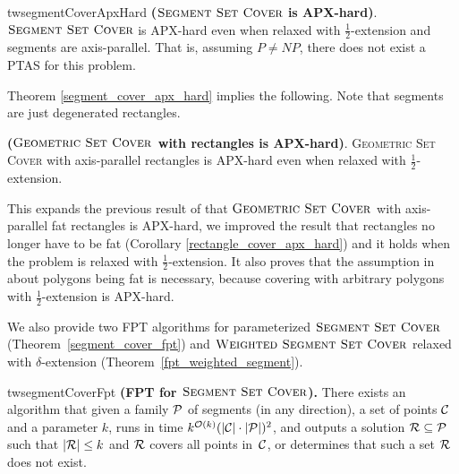 \begin{restatable}{tw}{segmentCoverApxHard}{
\label{segment_cover_apx_hard}
	\textbf{($\textsc{Segment Set Cover}$ is APX-hard)}.	
	$\textsc{Segment Set Cover}$
	is APX-hard even when 
	relaxed with $\frac{1}{2}$-extension
	and segments are axis-parallel.
	That is, assuming $P\neq NP$, there does not exist a PTAS
	for this problem.
}\end{restatable}

Theorem \ref{segment_cover_apx_hard} implies the following.
Note that segments are just degenerated rectangles.

\begin{corollary}{
\label{rectangle_cover_apx_hard}
	\textbf{($\textsc{Geometric Set Cover}$ with rectangles is APX-hard)}.	
	\textsc{Geometric} \textsc{Set} \textsc{Cover}
	with axis-parallel rectangles is APX-hard
	even when relaxed with $\frac{1}{2}$-extension.
}\end{corollary}

This expands the previous result of \cite{rectangles_apx_hard} 
that $\textsc{Geometric Set Cover}$
with axis-parallel fat rectangles is APX-hard,
we improved the result that rectangles no longer
have to be fat (Corollary \ref{rectangle_cover_apx_hard})
and it holds when the problem is relaxed with $\frac{1}{2}$-extension.
It also proves that the assumption in \cite{harpeled12}
about polygons being fat is necessary, because
covering with arbitrary polygons with $\frac{1}{2}$-extension is APX-hard.

We also provide two FPT algorithms for parameterized $\textsc{Segment Set Cover}$ 	
(Theorem~\ref{segment_cover_fpt})
and $\textsc{Weighted Segment Set Cover}$ relaxed with $\delta$-extension
(Theorem~\ref{fpt_weighted_segment}).

\begin{restatable}{tw}{segmentCoverFpt}{
	\label{segment_cover_fpt}
	\textbf{(FPT for $\textsc{Segment Set Cover}$).}
	There exists an algorithm that given a family $\mathcal{P}$ of
	segments (in any direction),
	a set of points $\mathcal{C}$
	and a parameter $k$,
	runs in time ${k^{\mathcal{O}(k)} (|\mathcal{C}|\cdot|\mathcal{P}|)^2}$,
	and outputs a solution $\mathcal{R} \subseteq \mathcal{P}$
	such that $|\mathcal{R}| \le k$ and $\mathcal{R}$ covers all points in~$\mathcal{C}$,
	or determines that such a set $\mathcal{R}$ does not exist.
}\end{restatable}

